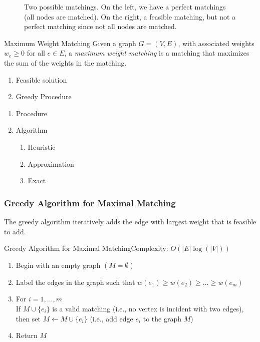 \begin{figure}[H]

\label{fig:matching}
\caption{Two possible matchings.  On the left, we have a perfect matchings (all nodes are matched).  On the right, a feasible matching, but not a perfect matching since not all nodes are matched.}

\end{figure}

\begin{definition}{Maximum Weight Matching}{}
Given a graph $G = (V,E)$, with associated weights $w_e\geq 0$ for all $e \in E$, a \emph{maximum weight matching} is a matching that maximizes the sum of the weights in the matching.
\end{definition}


%
\begin{enumerate}
\item Feasible solution
\item Greedy Procedure
\end{enumerate}
%
\begin{enumerate}
\item Procedure
\item Algorithm
\begin{enumerate}
\item Heuristic
\item Approximation
\item Exact
\end{enumerate}
\end{enumerate}
\subsubsection{Greedy Algorithm for Maximal Matching}
The greedy algorithm iteratively adds the edge with largest weight that is feasible to add.  
\begin{general}{Greedy Algorithm for Maximal Matching}{Complexity: $O(|E|\log(|V|))$}
\label{alg:greedy-matching}
\begin{enumerate}
\item Begin with an empty graph $(M = \emptyset)$
\item Label the edges in the graph such that $w(e_1) \geq w(e_2) \geq \dots \geq w(e_m)$
\item For $i=1, \dots, m$\\
\indent  If $M \cup\{e_i\}$ is a valid matching (i.e., no vertex is incident with two edges), then set $M \leftarrow M \cup \{e_i\}$ (i.e., add edge $e_i$ to the graph $M$)
\item Return $M$
\end{enumerate}
\end{general}

